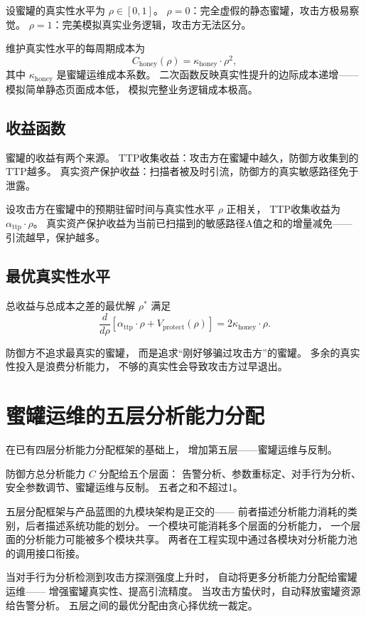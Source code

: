 \documentclass[11pt,a4paper]{article}
\begin{document}
设蜜罐的真实性水平为 $\rho \in [0,1]$。
$\rho = 0$：完全虚假的静态蜜罐，攻击方极易察觉。
$\rho = 1$：完美模拟真实业务逻辑，攻击方无法区分。

维护真实性水平的每周期成本为
\[
C_{\text{honey}}(\rho) = \kappa_{\text{honey}} \cdot \rho^2,
\]
其中 $\kappa_{\text{honey}}$ 是蜜罐运维成本系数。
二次函数反映真实性提升的边际成本递增——
模拟简单静态页面成本低，
模拟完整业务逻辑成本极高。

\subsection{收益函数}

蜜罐的收益有两个来源。
TTP收集收益：攻击方在蜜罐中越久，防御方收集到的TTP越多。
真实资产保护收益：扫描者被及时引流，防御方的真实敏感路径免于泄露。

设攻击方在蜜罐中的预期驻留时间与真实性水平 $\rho$ 正相关，
TTP收集收益为 $\alpha_{\text{ttp}} \cdot \rho$。
真实资产保护收益为当前已扫描到的敏感路径A值之和的增量减免——
引流越早，保护越多。

\subsection{最优真实性水平}

总收益与总成本之差的最优解 $\rho^*$ 满足
\[
\frac{d}{d\rho} \left[ \alpha_{\text{ttp}} \cdot \rho + V_{\text{protect}}(\rho) \right]
= 2 \kappa_{\text{honey}} \cdot \rho.
\]

防御方不追求最真实的蜜罐，
而是追求“刚好够骗过攻击方”的蜜罐。
多余的真实性投入是浪费分析能力，
不够的真实性会导致攻击方过早退出。

\section{蜜罐运维的五层分析能力分配}

在已有四层分析能力分配框架的基础上，
增加第五层——蜜罐运维与反制。

防御方总分析能力 $C$ 分配给五个层面：
告警分析、参数重标定、对手行为分析、安全参数调节、蜜罐运维与反制。
五者之和不超过1。

五层分配框架与产品蓝图的九模块架构是正交的——
前者描述分析能力消耗的类别，后者描述系统功能的划分。
一个模块可能消耗多个层面的分析能力，
一个层面的分析能力可能被多个模块共享。
两者在工程实现中通过各模块对分析能力池的调用接口衔接。

当对手行为分析检测到攻击方探测强度上升时，
自动将更多分析能力分配给蜜罐运维——
增强蜜罐真实性、提高引流精度。
当攻击方蛰伏时，自动释放蜜罐资源给告警分析。
五层之间的最优分配由贪心择优统一裁定。
\end{document}
